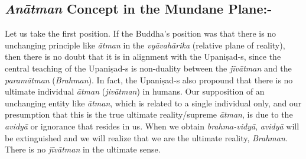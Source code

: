 \vspace{-.3cm}

\subsection*{\textit{Anātman} Concept in the Mundane Plane:-}

Let us take the first position. If the Buddha’s position was that there is no unchanging principle like \textit{ātman} in the \textit{vyāvahārika} (relative plane of reality), then there is no doubt that it is in alignment with the Upaniṣad-s, since the central teaching of the Upaniṣad-s is non-duality between the \textit{jīvātman} and the \textit{paramātman} (\textit{Brahman}). In fact, the Upaniṣad-s also propound that there is no ultimate individual \textit{ātman} (\textit{jivātman}) in humans. Our supposition of an unchanging entity like \textit{ātman}, which is related to a single individual only, and our presumption that this is the true ultimate reality/supreme \textit{ātman}, is due to the \textit{avidyā} or ignorance that resides in us. When we obtain \textit{brahma-vidyā}, \textit{avidyā} will be extinguished and we will realize that we are the ultimate reality, \textit{Brahman}. There is no \textit{jīvātman} in the ultimate sense.

